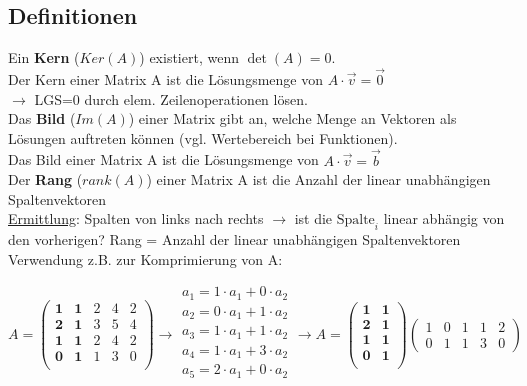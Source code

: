 \subsection{Definitionen}

Ein \textbf{Kern} (\(Ker(A)\)) existiert, wenn \(\det(A) = 0\).\\
Der Kern einer Matrix A ist die Lösungsmenge von \(A \cdot \vec{v} = \vec{0}\)\\
\(\rightarrow\) LGS=0 durch elem. Zeilenoperationen lösen.\\

Das \textbf{Bild} (\(Im(A)\)) einer Matrix gibt an, welche Menge an Vektoren als Lösungen auftreten können (vgl. Wertebereich bei Funktionen).\\
Das Bild einer Matrix A ist die Lösungsmenge von \(A \cdot \vec{v} = \vec{b}\)\\


Der \textbf{Rang} (\(rank(A)\)) einer Matrix A ist die Anzahl der linear unabhängigen Spaltenvektoren\\
\underline{Ermittlung}: Spalten von links nach rechts \(\rightarrow\) ist die \(\text{Spalte}_i\) linear abhängig von den vorherigen? Rang = Anzahl der linear unabhängigen Spaltenvektoren\\
Verwendung z.B. zur Komprimierung von A:

\begin{equation*}
    A = \begin{pmatrix}
        \textbf{1} & \textbf{1} & 2 & 4 & 2\\
        \textbf{2} & \textbf{1} & 3 & 5 & 4\\
        \textbf{1} & \textbf{1} & 2 & 4 & 2\\
        \textbf{0} & \textbf{1} & 1 & 3 & 0\\        
    \end{pmatrix} \rightarrow \begin{array}{c}
        a_1 = 1 \cdot a_1 + 0 \cdot a_2\\
        a_2 = 0 \cdot a_1 + 1 \cdot a_2\\
        a_3 = 1 \cdot a_1 + 1 \cdot a_2\\
        a_4 = 1 \cdot a_1 + 3 \cdot a_2\\
        a_5 = 2 \cdot a_1 + 0 \cdot a_2\\
    \end{array} \rightarrow A = \begin{pmatrix}
        \textbf{1} & \textbf{1} \\
        \textbf{2} & \textbf{1} \\
        \textbf{1} & \textbf{1} \\
        \textbf{0} & \textbf{1} \\
    \end{pmatrix} \begin{pmatrix}
        1 & 0 & 1 & 1 & 2\\
        0 & 1 & 1 & 3 & 0
    \end{pmatrix}
\end{equation*}\\

